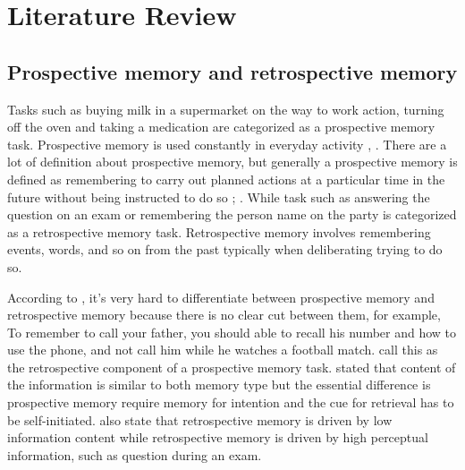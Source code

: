 
\chapter{Literature Review}
\section{Prospective memory and retrospective memory}

Tasks such as buying milk in a supermarket on the way to work action, turning off the oven and taking a medication are categorized as a prospective memory task. Prospective memory is used constantly in everyday activity \citep{gruneberAndMoris1978}, \citep{cohen1989}.
There are a lot of definition about prospective memory, but generally  a prospective memory is defined as remembering to carry out planned actions at a particular time in the future without being instructed to do so \citep{mcdaniel2007prospective}; \citep{GROOT2002}. While task such as answering the question on an exam or remembering the person name on the party is categorized as a retrospective memory task.
Retrospective memory involves remembering events, words, and so on from the past typically
when deliberating trying to do so.




According to \cite{BaddeleyWilkins1983}, it's very hard to differentiate between prospective memory and retrospective memory because there is no clear cut between them, for example, To remember to call your father, you should able to recall his number and how to use the phone, and not call him while he watches a football match. \cite{brandimonte1996prospective} call this as the retrospective component of a prospective memory task.
\cite{CockburnJ.1995Tiip} stated that content of the information is similar to both memory type but the essential difference is prospective memory require memory for intention and the cue for retrieval has to be self-initiated.
\cite{GuynnMelissaJ.1998PMWR} also state that retrospective memory is driven by low information content while retrospective memory is driven by high perceptual information, such as question during an exam.

